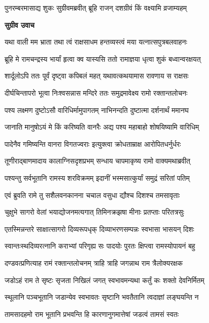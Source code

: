 \twolineshloka
{पुनरम्बरमासाद्य शुकः सुग्रीवमब्रवीत्}
{ब्रूहि राजन् दशग्रीवं किं वक्ष्यामि व्रजाम्यहम्} %

\textbf{सुग्रीव उवाच}

\twolineshloka
{यथा वाली मम भ्राता तथा त्वं राक्षसाधम}
{हन्तव्यस्त्वं मया यत्नात्सपुत्रबलवाहनः} %

\twolineshloka
{ब्रूहि मे रामचन्द्रस्य भार्यां हृत्वा क्व यास्यसि}
{ततो रामाज्ञया धृत्वा शुकं बध्वान्वरक्षयत्} %

\twolineshloka
{शार्दूलोऽपि ततः पूर्वं दृष्ट्वा कपिबलं महत्}
{यथावत्कथयामास रावणाय स राक्षसः} %

\twolineshloka
{दीर्घचिन्तापरो भूत्वा निःश्वसन्नास मन्दिरे}
{ततः समुद्रमावेक्ष्य रामो रक्तान्तलोचनः} %

\twolineshloka
{पश्य लक्ष्मण दुष्टोऽसौ वारिधिर्मामुपागतम्}
{नाभिनन्दति दुष्टात्मा दर्शनार्थं ममानघ} %

\twolineshloka
{जानाति मानुषोऽयं मे किं करिष्यति वानरैः}
{अद्य पश्य महाबाहो शोषयिष्यामि वारिधिम्} %

\twolineshloka
{पादेनैव गमिष्यन्ति वानरा विगतज्वराः}
{इत्युक्त्वा क्रोधताम्राक्ष आरोपितधर्नुर्धरः} %

\twolineshloka
{तूणीराद्बाणमादाय कालाग्निसदृशप्रभम्}
{सन्धाय चापमाकृष्य रामो वाक्यमथाब्रवीत्} %

\twolineshloka
{पश्यन्तु सर्वभूतानि रामस्य शरविक्रमम्}
{इदानीं भस्मसात्कुर्यां समुद्रं सरितां पतिम्} %

\twolineshloka
{एवं ब्रुवति रामे तु सशैलवनकानना}
{चचाल वसुधा द्यौश्च दिशश्च तमसावृताः} %

\twolineshloka
{चुक्षुभे सागरो वेलां भयाद्योजनमत्यगात्}
{तिमिनक्रझषा मीनाः प्रतप्ताः परितत्रसुः} %

\twolineshloka
{एतस्मिन्नन्तरे साक्षात्सागरो दिव्यरूपधृक्}
{दिव्याभरणसम्पन्नः स्वभासा भासयन् दिशः} %

\twolineshloka
{स्वान्तःस्थदिव्यरत्नानि कराभ्यां परिगृह्य सः}
{पादयोः पुरतः क्षिप्त्वा रामस्योपायनं बहु} %

\twolineshloka
{दण्डवत्प्रणित्याह रामं रक्तान्तलोचनम्}
{त्राहि त्राहि जगन्नाथ राम त्रैलोक्यरक्षक} %

\twolineshloka
{जडोऽहं राम ते सृष्टः सृजता निखिलं जगत्}
{स्वभावमन्यथा कर्तुं कः शक्तो देवनिर्मितम्} %

\twolineshloka
{स्थूलानि पञ्चभूतानि जडान्येव स्वभावतः}
{सृष्टानि भवतैतानि त्वदाज्ञां लङ्घयन्ति न} %

\twolineshloka
{तामसादहमो राम भूतानि प्रभवन्ति हि}
{कारणानुगमात्तेषां जडत्वं तामसं स्वतः} %

